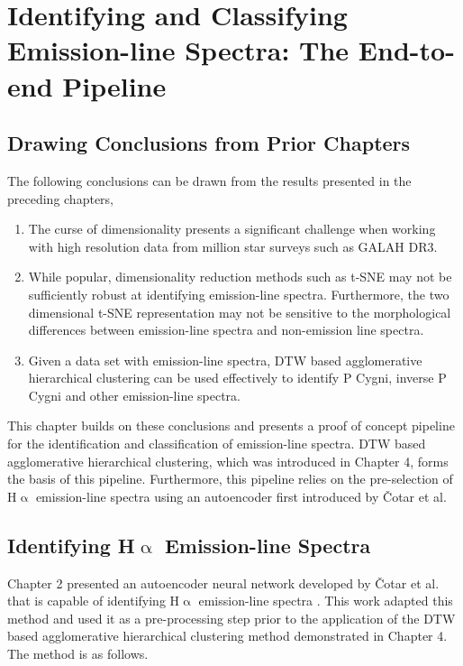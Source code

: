 \chapter{Identifying and Classifying Emission-line Spectra: The End-to-end Pipeline}

\section{Drawing Conclusions from Prior Chapters}

The following conclusions can be drawn from the results presented in the preceding chapters,

\begin{enumerate}
    \item The curse of dimensionality presents a significant challenge when working with high resolution data from million star surveys such as GALAH DR3. 
    \item While popular,  dimensionality reduction methods such as t-SNE may not be sufficiently robust at identifying emission-line spectra. Furthermore, the two dimensional t-SNE representation may not be sensitive to the morphological differences between emission-line spectra and non-emission line spectra.
    \item Given a data set with emission-line spectra, DTW based agglomerative hierarchical clustering can be used effectively to identify P Cygni, inverse P Cygni and other emission-line spectra.
\end{enumerate}

This chapter builds on these conclusions and presents a proof of concept pipeline for the identification and classification of emission-line spectra. DTW based agglomerative hierarchical clustering, which  was introduced in Chapter 4, forms the basis of this pipeline. Furthermore, this pipeline relies on the pre-selection of H$\upalpha$ emission-line spectra using an autoencoder first introduced by Čotar et al.

\section{Identifying H$\upalpha$ Emission-line Spectra}

Chapter 2 presented an autoencoder neural network developed by Čotar et al. that is capable of identifying H$\upalpha$ emission-line spectra \citep{vcotar2021galah}. This work adapted this method and used it as a pre-processing step prior to the application of the DTW based agglomerative hierarchical clustering method demonstrated in Chapter 4. The method is as follows.

